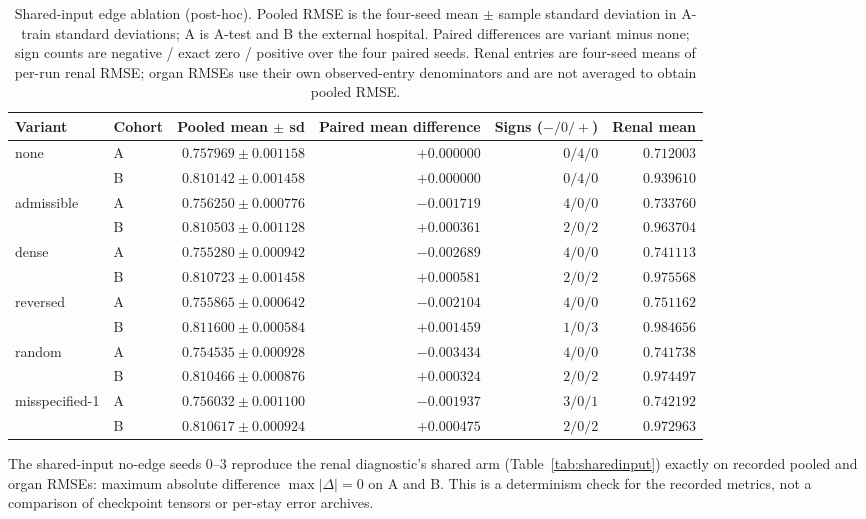 \begin{table}[tbp]
\centering
\caption{Shared-input edge ablation (post-hoc). Pooled RMSE is the four-seed mean $\pm$ sample standard deviation in A-train standard deviations; A is A-test and B the external hospital. Paired differences are variant minus none; sign counts are negative / exact zero / positive over the four paired seeds. Renal entries are four-seed means of per-run renal RMSE; organ RMSEs use their own observed-entry denominators and are not averaged to obtain pooled RMSE.}\label{tab:sharedinputedges}
\small
\setlength{\tabcolsep}{5pt}
\begin{tabular}{llrrrr}
\toprule
Variant & Cohort & Pooled mean $\pm$ sd & Paired mean difference & Signs ($-/0/+$) & Renal mean \\
\midrule
none & A & $0.757969\pm0.001158$ & $+0.000000$ & $0/4/0$ & $0.712003$ \\ 
 & B & $0.810142\pm0.001458$ & $+0.000000$ & $0/4/0$ & $0.939610$ \\ 
\addlinespace
admissible & A & $0.756250\pm0.000776$ & $-0.001719$ & $4/0/0$ & $0.733760$ \\ 
 & B & $0.810503\pm0.001128$ & $+0.000361$ & $2/0/2$ & $0.963704$ \\ 
\addlinespace
dense & A & $0.755280\pm0.000942$ & $-0.002689$ & $4/0/0$ & $0.741113$ \\ 
 & B & $0.810723\pm0.001458$ & $+0.000581$ & $2/0/2$ & $0.975568$ \\ 
\addlinespace
reversed & A & $0.755865\pm0.000642$ & $-0.002104$ & $4/0/0$ & $0.751162$ \\ 
 & B & $0.811600\pm0.000584$ & $+0.001459$ & $1/0/3$ & $0.984656$ \\ 
\addlinespace
random & A & $0.754535\pm0.000928$ & $-0.003434$ & $4/0/0$ & $0.741738$ \\ 
 & B & $0.810466\pm0.000876$ & $+0.000324$ & $2/0/2$ & $0.974497$ \\ 
\addlinespace
misspecified-1 & A & $0.756032\pm0.001100$ & $-0.001937$ & $3/0/1$ & $0.742192$ \\ 
 & B & $0.810617\pm0.000924$ & $+0.000475$ & $2/0/2$ & $0.972963$ \\ 
\bottomrule
\end{tabular}
\end{table}
The shared-input no-edge seeds $0$--$3$ reproduce the renal diagnostic's shared arm (Table~\ref{tab:sharedinput}) exactly on recorded pooled and organ RMSEs: maximum absolute difference $\max|\Delta|=0$ on A and B. This is a determinism check for the recorded metrics, not a comparison of checkpoint tensors or per-stay error archives.

